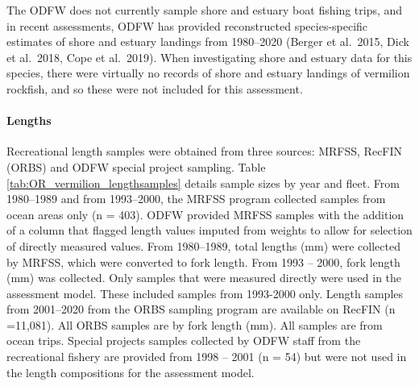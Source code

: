 \documentclass[11pt,
  english,
  a4paper,
]{article}
\begin{document}
\leavevmode\tagmcend\tagstructend


The ODFW does not currently sample shore and estuary boat fishing trips, and in recent assessments, ODFW has provided reconstructed species-specific estimates of shore and estuary landings from 1980--2020 (Berger et al.~2015, Dick et al.~2018, Cope et al.~2019). When investigating shore and estuary data for this species, there were virtually no records of shore and estuary landings of vermilion rockfish, and so these were not included for this assessment.

\leavevmode\tagmcend\tagstructend\par


\hypertarget{lengths-1}{%
\paragraph{Lengths}\label{lengths-1}}

\leavevmode\tagmcend\tagstructend


Recreational length samples were obtained from three sources: MRFSS, RecFIN (ORBS) and ODFW special project sampling. Table \ref{tab:OR_vermilion_lengthsamples} details sample sizes by year and fleet. From 1980--1989 and from 1993--2000, the MRFSS program collected samples from ocean areas only (n = 403). ODFW provided MRFSS samples with the addition of a column that flagged length values imputed from weights to allow for selection of directly measured values. From 1980--1989, total lengths (mm) were collected by MRFSS, which were converted to fork length. From 1993 -- 2000, fork length (mm) was collected. Only samples that were measured directly were used in the assessment model. These included samples from 1993-2000 only. Length samples from 2001--2020 from the ORBS sampling program are available on RecFIN (n =11,081). All ORBS samples are by fork length (mm). All samples are from ocean trips. Special projects samples collected by ODFW staff from the recreational fishery are provided from 1998 -- 2001 (n = 54) but were not used in the length compositions for the assessment model.

\leavevmode\tagmcend\tagstructend\par

\end{document}
